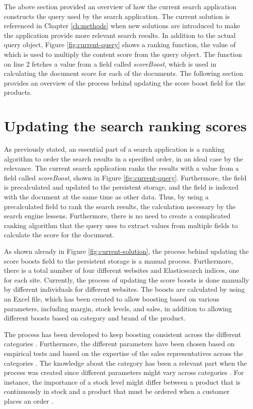 The above section provided an overview of how the current search application constructs the query used
by the search application.
The current solution is referenced in Chapter \ref{ch:methods} when 
new solutions are introduced to make the application provide more relevant search results.
In addition to the actual query object, Figure \ref{fig:current-query} shows a ranking function, 
the value of which is used to multiply the content score from the query object. 
The function on line 2 fetches a value from a field called \emph{scoreBoost}, which is used in calculating 
the document score for each of the documents.
The following section provides an overview of the process behind updating the score boost field for the
products.


\section{Updating the search ranking scores}


As previously stated, an essential part of a search application is a ranking algorithm to order the
search results in a specified order, in an ideal case by the relevance.
The current search application ranks the results with a value from a field called \emph{scoreBoost},
shown in Figure \ref{fig:current-query}. 
Furthermore, the field is precalculated and updated to the persistent storage, and the field 
is indexed with the document at the same time as other data.
Thus, by using a precalculated field to rank the search results, the calculation necessary by the
search engine lessens.
Furthermore, there is no need to create a complicated ranking algorithm that the query uses
to extract values from multiple fields to calculate the score for the document.


As shown already in Figure \ref{fig:current-solution}, the process behind updating the 
score boosts field to the persistent storage is a manual process.
Furthermore, there is a total number of four different websites and Elasticsearch indices,
one for each site. 
Currently, the process of updating the score boosts is done manually by different individuals for different websites.
The boosts are calculated by using an Excel file, which has been created to allow boosting based on 
various parameters, including margin, stock levels, and sales, in addition to allowing
different boosts based on category and brand of the product.


The process has been developed to keep boosting consistent across the different categories 
\cite{searchSurvey}.
Furthermore, the different parameters have been chosen based on empirical tests and based on 
the expertise of the sales representatives across the categories \cite{searchSurvey}.
The knowledge about the category has been a relevant part when the process was created
since different parameters might vary across categories \cite{searchSurvey}.
For instance, the importance of a stock level might differ between a product that is 
continuously in stock and a product that must be ordered when a customer places an order
\cite{searchSurvey}.


